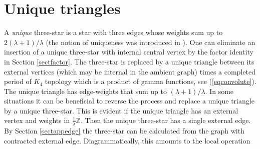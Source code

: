 \documentclass[oneside]{amsart}
\newcommand{\ZZ}{{\mathbb Z}}
\theoremstyle{plain}
\begin{document}
\section{Unique triangles}\label{sectunique}
A {\em unique} three-star is a star with three edges whose weights sum up to $2(\lambda+1)/\lambda$ (the notion of uniqueness was introduced in \cite{K2}).
One can eliminate an insertion of a unique three-star with internal central vertex by the factor identity in Section \ref{sectfactor}.
The three-star is replaced by a unique triangle between its external vertices (which may be internal in the ambient graph) times
a completed period of $K_4$ topology which is a product of gamma functions, see (\ref{eqconvolute}).
The unique triangle has edge-weights that sum up to $(\lambda+1)/\lambda$. In some situations it can be beneficial to reverse the process and replace a unique triangle
by a unique three-star. This is evident if the unique triangle has an external vertex and weights in $\frac{1}{\lambda}\ZZ$. Then the unique three-star has a single external edge.
By Section \ref{sectappedge} the three-star can be calculated from the graph with contracted external edge. Diagrammatically, this amounts to the local operation
\end{document}
